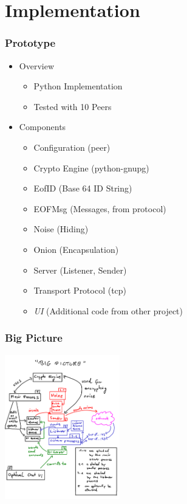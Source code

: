\documentclass{beamer}
\begin{document}
\section{Implementation}
\frame
{
  \frametitle{Prototype}
  \begin{itemize}
     \item Overview
      \begin{itemize}
          \item Python Implementation
          \item Tested with 10 Peers
      \end{itemize}
      \item Components
      \begin{itemize}
          \item Configuration (peer)
          \item Crypto Engine (python-gnupg)
          \item EofID (Base 64 ID String)
          \item EOFMsg (Messages, from protocol)
          \item Noise (Hiding)
          \item Onion (Encapsulation)
          \item Server (Listener, Sender)
          \item Transport Protocol (tcp)
          \item \textit{UI} (Additional code from other project)
      \end{itemize}
   \end{itemize}
}
\frame
{
  \frametitle{Big Picture}
  \begin{center}
   \includegraphics[width=5cm]{../bigpicture.png}
  \end{center}
}
\end{document}
